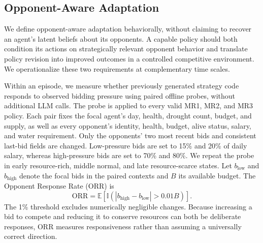 \documentclass[letterpaper]{article} %
\begin{document}
\subsection{Opponent-Aware Adaptation}

We define opponent-aware adaptation behaviorally, without claiming to
recover an agent's latent beliefs about its opponents. A capable policy
should both condition its actions on strategically relevant opponent
behavior and translate policy revision into improved outcomes in a
controlled competitive environment. We operationalize these two
requirements at complementary time scales.

Within an episode, we measure whether previously generated strategy
code responds to observed bidding pressure using paired offline probes,
without additional LLM calls. The probe is applied to every valid
MR1, MR2, and MR3 policy. Each pair fixes the focal agent's day,
health, drought count, budget, and supply, as well as every opponent's
identity, health, budget, alive status, salary, and water requirement.
Only the opponents' two most recent bids and consistent last-bid fields
are changed. Low-pressure bids are set to 15\% and 20\% of daily salary,
whereas high-pressure bids are set to 70\% and 80\%. We repeat the probe
in early resource-rich, middle normal, and late resource-scarce states.
Let $b_{\mathrm{low}}$ and $b_{\mathrm{high}}$ denote the focal bids in
the paired contexts and $B$ its available budget. The Opponent Response
Rate (ORR) is
\begin{equation}
    \mathrm{ORR}
    =
    \mathbb{E}\!\left[
        \mathbb{I}\!\left(
            \left|b_{\mathrm{high}}-b_{\mathrm{low}}\right|>0.01B
        \right)
    \right].
\end{equation}
The 1\% threshold excludes numerically negligible changes. Because
increasing a bid to compete and reducing it to conserve resources can
both be deliberate responses, ORR measures responsiveness rather than
assuming a universally correct direction.
\end{document}
